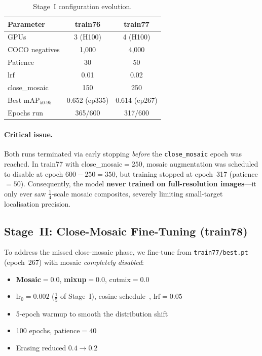 \documentclass[11pt, a4paper]{article}
\newcommand{\mapfull}{\text{mAP}_{50\text{-}95}}
\begin{document}
\begin{table}[h]
  \centering
  \caption{Stage~I configuration evolution.}
  \label{tab:stage1}
  \begin{tabular}{@{}lcc@{}}
    \toprule
    \textbf{Parameter} & \textbf{train76} & \textbf{train77} \\
    \midrule
    GPUs               & 3 (H100)         & 4 (H100)         \\
    COCO negatives     & 1{,}000          & 4{,}000          \\
    Patience           & 30               & 50               \\
    $\text{lrf}$       & 0.01             & 0.02             \\
    close\_mosaic      & 150              & 250              \\
    \midrule
    Best $\mapfull$    & 0.652 (ep335)    & 0.614 (ep267)    \\
    Epochs run         & 365/600          & 317/600          \\
    \bottomrule
  \end{tabular}
\end{table}

\paragraph{Critical issue.}  Both runs terminated via early stopping \emph{before} the
\texttt{close\_mosaic} epoch was reached. In train77 with close\_mosaic$=250$,
mosaic augmentation was scheduled to disable at epoch $600 - 250 = 350$, but
training stopped at epoch~317 (patience$=50$). Consequently, the model
\textbf{never trained on full-resolution images}---it only ever saw
$\frac{1}{4}$-scale mosaic composites, severely limiting small-target
localisation precision.

\subsection{Stage~II: Close-Mosaic Fine-Tuning (train78)}
\label{sec:stage2}

To address the missed close-mosaic phase, we fine-tune from
\texttt{train77/best.pt} (epoch~267) with mosaic \emph{completely disabled}:

\begin{itemize}[leftmargin=*, itemsep=2pt]
  \item \textbf{Mosaic}$= 0.0$, \textbf{mixup}$= 0.0$, cutmix$= 0.0$
  \item $\text{lr}_0 = 0.002$ ($\frac{1}{5}$ of Stage~I),
        cosine schedule~\cite{loshchilov2016sgdr}, $\text{lrf} = 0.05$
  \item 5-epoch warmup to smooth the distribution shift
  \item 100 epochs, patience$= 40$
  \item Erasing reduced $0.4 \to 0.2$
\end{itemize}
\end{document}
